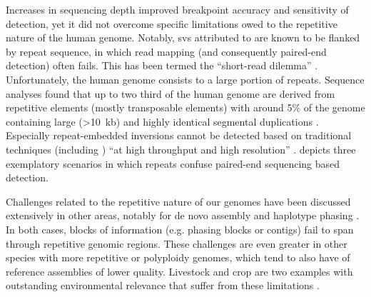 
Increases in sequencing depth improved breakpoint accuracy and sensitivity of
\sv detection, yet it did not overcome specific limitations owed to the
repetitive nature of the human genome. Notably, \acp{sv} attributed to \nahr are
known to be flanked by repeat sequence, in which read mapping (and consequently
paired-end \sv detection) often fails. This has been termed the ``short-read
dilemma'' \citep{Onishi-Seebacher2011}. Unfortunately, the human genome consists
to a large portion of repeats. Sequence analyses found that up to two third of
the human genome are derived from repetitive elements (mostly transposable
elements) \citep{DeKoning2011} with around 5\% of the genome containing large
(>10~kb) and highly identical segmental duplications \citep{Lander2001}.
Especially repeat-embedded inversions cannot be detected based on traditional
techniques (including \mps) ``at high throughput and high resolution''
\citep{Sanders2016}.  depicts three exemplatory
scenarios in which repeats confuse paired-end sequencing based \sv detection.

Challenges related to the repetitive nature of our genomes have been discussed
extensively in other areas, notably for de novo assembly \citep{Alkan2011_assembly}
and haplotype phasing \citep{Browning2011}. In both cases, blocks of information
(e.g. phasing blocks or contigs) fail to span through repetitive genomic regions.
These challenges are even greater in other species with more repetitive or
polyploidy genomes, which tend to also have of reference assemblies of lower
quality. Livestock and crop are two examples with outstanding environmental
relevance that suffer from these limitations \citep{Bickhart2014,Saxena2014}.

